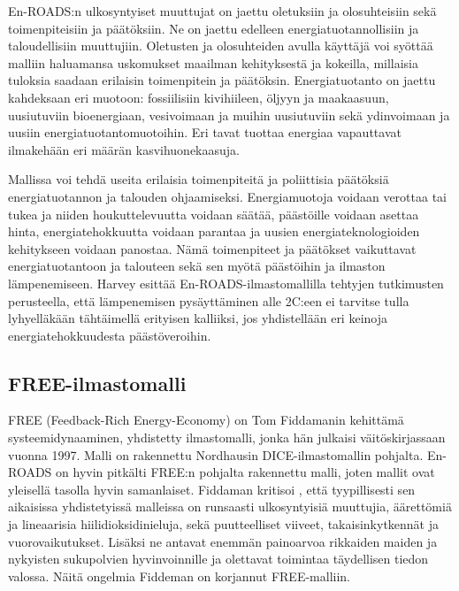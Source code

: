 \documentclass[finnish,12pt,a4paper,pdftex]{article}
\begin{document}
\begin{onehalfspacing}
En-ROADS:n ulkosyntyiset muuttujat on jaettu oletuksiin ja olosuhteisiin sekä toimenpiteisiin ja päätöksiin. Ne on jaettu edelleen energiatuotannollisiin ja taloudellisiin muuttujiin. Oletusten ja olosuhteiden avulla käyttäjä voi syöttää malliin haluamansa uskomukset maailman kehityksestä ja kokeilla, millaisia tuloksia saadaan erilaisin toimenpitein ja päätöksin. Energiatuotanto on jaettu kahdeksaan eri muotoon: fossiilisiin kivihiileen, öljyyn ja maakaasuun, uusiutuviin bioenergiaan, vesivoimaan ja muihin uusiutuviin sekä ydinvoimaan ja uusiin energiatuotantomuotoihin. Eri tavat tuottaa energiaa vapauttavat ilmakehään eri määrän kasvihuonekaasuja. \cite{Enroads}

Mallissa voi tehdä useita erilaisia toimenpiteitä ja poliittisia päätöksiä energiatuotannon ja talouden ohjaamiseksi. Energiamuotoja voidaan verottaa tai tukea ja niiden houkuttelevuutta voidaan säätää, päästöille voidaan asettaa hinta, energiatehokkuutta voidaan parantaa ja uusien energiateknologioiden kehitykseen voidaan panostaa. Nämä toimenpiteet ja päätökset vaikuttavat energiatuotantoon ja talouteen sekä sen myötä päästöihin ja ilmaston lämpenemiseen. \cite{Harvey2013, Enroads} Harvey \cite{Harvey2013} esittää En-ROADS-ilmastomallilla tehtyjen tutkimusten perusteella, että lämpenemisen pysäyttäminen alle 2\degree C:een ei tarvitse tulla lyhyelläkään tähtäimellä erityisen kalliiksi, jos yhdistellään eri keinoja energiatehokkuudesta päästöveroihin. 

\subsection{FREE-ilmastomalli \label{ilmasto:free}}

FREE (Feedback-Rich Energy-Economy) on Tom Fiddamanin kehittämä systeemidynaaminen, yhdistetty ilmastomalli, jonka hän julkaisi väitöskirjassaan vuonna 1997. Malli on rakennettu Nordhausin DICE-ilmastomallin \cite{Nordhaus1992} pohjalta. \cite{Fiddaman1997} En-ROADS on hyvin pitkälti FREE:n pohjalta rakennettu malli, joten mallit ovat yleisellä tasolla hyvin samanlaiset. Fiddaman kritisoi \cite{Fiddaman2002}, että tyypillisesti sen aikaisissa yhdistetyissä malleissa on runsaasti ulkosyntyisiä muuttujia, äärettömiä ja lineaarisia hiilidioksidinieluja, sekä puutteelliset viiveet, takaisinkytkennät ja vuorovaikutukset. Lisäksi ne antavat enemmän painoarvoa rikkaiden maiden ja nykyisten sukupolvien hyvinvoinnille ja olettavat toimintaa täydellisen tiedon valossa. Näitä ongelmia Fiddeman on korjannut FREE-malliin. 


\end{onehalfspacing}
\end{document}
